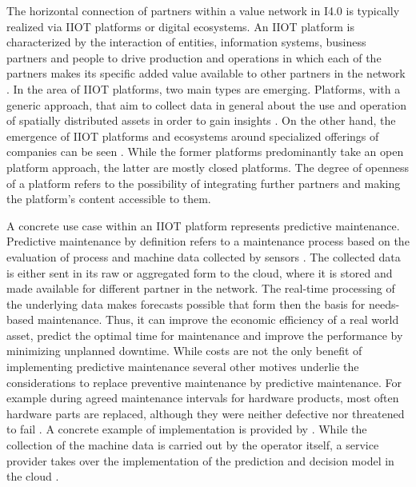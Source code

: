 The horizontal connection of partners within a value network in \ac{I4.0} is typically realized via \ac{IIOT} platforms or digital ecosystems. An \ac{IIOT} platform is characterized by the interaction of entities, information systems, business partners and people to drive production and operations in which each of the partners makes its specific added value available to other partners in the network \cite[p. 5]{Falk2020ValueChina} \cite[p. 2]{Falk2021DigitaleEntwicklung}. In the area of \ac{IIOT} platforms, two main types are emerging. Platforms, with a generic approach, that aim to collect data in general about the use and operation of spatially distributed assets in order to gain insights \cite[p. 11]{Falk2021DigitaleEntwicklung}. On the other hand, the emergence of \ac{IIOT} platforms and ecosystems around specialized offerings of companies can be seen \cite[p. 13]{Falk2021DigitaleEntwicklung}. While the former platforms predominantly take an open platform approach, the latter are mostly closed platforms. The degree of openness of a platform refers to the possibility of integrating further partners and making the platform's content accessible to them. 

A concrete use case within an \ac{IIOT} platform represents predictive maintenance. Predictive maintenance by definition refers to a maintenance process based on the evaluation of process and machine data collected by sensors \cite[p. 1670]{Selcuk2016PredictiveTrends:}. The collected data is either sent in its raw or aggregated form to the cloud, where it is stored and made available for different partner in the network. The real-time processing of the underlying data makes forecasts possible that form then the basis for needs-based maintenance. Thus, it can improve the economic efficiency of a real world asset, predict the optimal time for maintenance and improve the performance by minimizing unplanned downtime. While costs are not the only benefit of implementing predictive maintenance several other motives underlie the considerations to replace preventive maintenance by predictive maintenance. For example during agreed maintenance intervals for hardware products, most often hardware parts are replaced, although they were neither defective nor threatened to fail \cite[p. 1672]{Selcuk2016PredictiveTrends:}. A concrete example of implementation is provided by \citeauthor{Cavalieri2020AShell}. While the collection of the machine data is carried out by the operator itself, a service provider takes over the implementation of the prediction and decision model in the cloud \cite[p. 11]{Cavalieri2020AShell}.

